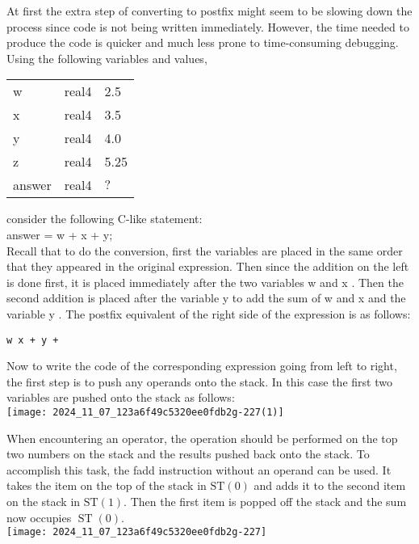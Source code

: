 \documentclass[10pt]{article}
\begin{document}
At first the extra step of converting to postfix might seem to be slowing down the process since code is not being written immediately. However, the time needed to produce the code is quicker and much less prone to time-consuming debugging. Using the following variables and values,

\begin{center}
\begin{tabular}{lll}
w & real4 & 2.5 \\
x & real4 & 3.5 \\
y & real4 & 4.0 \\
z & real4 & 5.25 \\
answer & real4 & $?$ \\
\end{tabular}
\end{center}

consider the following C-like statement:\\
answer = w + x + y;\\
Recall that to do the conversion, first the variables are placed in the same order that they appeared in the original expression. Then since the addition on the left is done first, it is placed immediately after the two variables w and x . Then the second addition is placed after the variable y to add the sum of w and x and the variable y . The postfix equivalent of the right side of the expression is as follows:

\begin{verbatim}
w x + y +
\end{verbatim}

Now to write the code of the corresponding expression going from left to right, the first step is to push any operands onto the stack. In this case the first two variables are pushed onto the stack as follows:\\
\texttt{[image: 2024\_11\_07\_123a6f49c5320ee0fdb2g-227(1)]}

When encountering an operator, the operation should be performed on the top two numbers on the stack and the results pushed back onto the stack. To accomplish this task, the fadd instruction without an operand can be used. It takes the item on the top of the stack in $\mathrm{ST}(0)$ and adds it to the second item on the stack in $\mathrm{ST}(1)$. Then the first item is popped off the stack and the sum now occupies $\operatorname{ST}(0)$.\\
\texttt{[image: 2024\_11\_07\_123a6f49c5320ee0fdb2g-227]}
\end{document}
